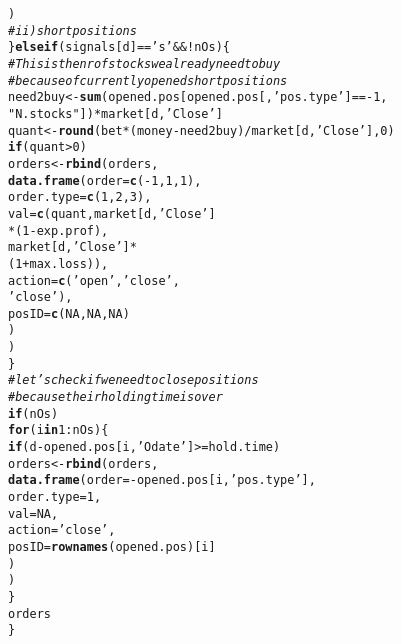 \documentclass{article}\usepackage[]{graphicx}\usepackage[]{color}
\makeatletter
\newcommand{\hlnum}[1]{\textcolor[rgb]{0.686,0.059,0.569}{#1}}%
\newcommand{\hlstr}[1]{\textcolor[rgb]{0.192,0.494,0.8}{#1}}%
\newcommand{\hlcom}[1]{\textcolor[rgb]{0.678,0.584,0.686}{\textit{#1}}}%
\newcommand{\hlopt}[1]{\textcolor[rgb]{0,0,0}{#1}}%
\newcommand{\hlstd}[1]{\textcolor[rgb]{0.345,0.345,0.345}{#1}}%
\newcommand{\hlkwa}[1]{\textcolor[rgb]{0.161,0.373,0.58}{\textbf{#1}}}%
\newcommand{\hlkwb}[1]{\textcolor[rgb]{0.69,0.353,0.396}{#1}}%
\newcommand{\hlkwc}[1]{\textcolor[rgb]{0.333,0.667,0.333}{#1}}%
\newcommand{\hlkwd}[1]{\textcolor[rgb]{0.737,0.353,0.396}{\textbf{#1}}}%
\newenvironment{kframe}{%
 \def\at@end@of@kframe{}%
 \ifinner\ifhmode%
  \def\at@end@of@kframe{\end{minipage}}%
  \begin{minipage}{\columnwidth}%
 \fi\fi%
 \def\FrameCommand##1{\hskip\@totalleftmargin \hskip-\fboxsep
 \colorbox{shadecolor}{##1}\hskip-\fboxsep
     \hskip-\linewidth \hskip-\@totalleftmargin \hskip\columnwidth}%
 \MakeFramed {\advance\hsize-\width
   \@totalleftmargin\z@ \linewidth\hsize
   \@setminipage}}%
 {\par\unskip\endMakeFramed%
 \at@end@of@kframe}
\newenvironment{knitrout}{}{} %
\makeatother
\begin{document}
\begin{knitrout}
\begin{kframe}
\begin{alltt}
                      \hlstd{)}
    \hlcom{#ii) short positions}
  \hlstd{\}} \hlkwa{else if} \hlstd{(signals[d]} \hlopt{==} \hlstr{'s'} \hlopt{&& !}\hlstd{nOs) \{}
    \hlcom{#This is the nr of stocks we already need to buy}
    \hlcom{#because of currently opened short positions}
    \hlstd{need2buy} \hlkwb{<-} \hlkwd{sum}\hlstd{(opened.pos[opened.pos[,} \hlstr{'pos.type'}\hlstd{]} \hlopt{== -}\hlnum{1}\hlstd{,}
                               \hlstr{"N.stocks"}\hlstd{])}\hlopt{*}\hlstd{market[d,} \hlstr{'Close'}\hlstd{]}
    \hlstd{quant} \hlkwb{<-} \hlkwd{round}\hlstd{(bet}\hlopt{*}\hlstd{(money}\hlopt{-}\hlstd{need2buy)}\hlopt{/}\hlstd{market[d,} \hlstr{'Close'}\hlstd{],} \hlnum{0}\hlstd{)}
    \hlkwa{if}\hlstd{(quant} \hlopt{>} \hlnum{0}\hlstd{)}
      \hlstd{orders} \hlkwb{<-} \hlkwd{rbind}\hlstd{(orders,}
                      \hlkwd{data.frame}\hlstd{(}\hlkwc{order} \hlstd{=} \hlkwd{c}\hlstd{(}\hlopt{-}\hlnum{1}\hlstd{,} \hlnum{1}\hlstd{,} \hlnum{1}\hlstd{),}
                                 \hlkwc{order.type} \hlstd{=} \hlkwd{c}\hlstd{(}\hlnum{1}\hlstd{,} \hlnum{2}\hlstd{,} \hlnum{3}\hlstd{),}
                                 \hlkwc{val} \hlstd{=} \hlkwd{c}\hlstd{(quant, market[d,} \hlstr{'Close'}\hlstd{]}
                                         \hlopt{*}\hlstd{(}\hlnum{1}\hlopt{-}\hlstd{exp.prof),}
                                         \hlstd{market[d,} \hlstr{'Close'}\hlstd{]}\hlopt{*}
                                           \hlstd{(}\hlnum{1} \hlopt{+} \hlstd{max.loss)),}
                                 \hlkwc{action} \hlstd{=} \hlkwd{c}\hlstd{(}\hlstr{'open'}\hlstd{,} \hlstr{'close'}\hlstd{,}
                                            \hlstr{'close'}\hlstd{),}
                                 \hlkwc{posID} \hlstd{=} \hlkwd{c}\hlstd{(}\hlnum{NA}\hlstd{,} \hlnum{NA}\hlstd{,} \hlnum{NA}\hlstd{)}
                                 \hlstd{)}
                      \hlstd{)}
  \hlstd{\}}
  \hlcom{#let's check if we need to close positions}
  \hlcom{#because their holding time is over }
  \hlkwa{if}\hlstd{(nOs)}
    \hlkwa{for}\hlstd{(i} \hlkwa{in} \hlnum{1}\hlopt{:}\hlstd{nOs) \{}
      \hlkwa{if}\hlstd{(d} \hlopt{-} \hlstd{opened.pos[i,} \hlstr{'Odate'}\hlstd{]} \hlopt{>=} \hlstd{hold.time)}
        \hlstd{orders} \hlkwb{<-} \hlkwd{rbind}\hlstd{(orders,}
                        \hlkwd{data.frame}\hlstd{(}\hlkwc{order} \hlstd{=} \hlopt{-}\hlstd{opened.pos[i,} \hlstr{'pos.type'}\hlstd{],}
                                   \hlkwc{order.type} \hlstd{=} \hlnum{1}\hlstd{,}
                                   \hlkwc{val} \hlstd{=} \hlnum{NA}\hlstd{,}
                                   \hlkwc{action} \hlstd{=} \hlstr{'close'}\hlstd{,}
                                   \hlkwc{posID} \hlstd{=} \hlkwd{rownames}\hlstd{(opened.pos)[i]}
                                   \hlstd{)}
                        \hlstd{)}
        \hlstd{\}}
  \hlstd{orders}
\hlstd{\}}
\end{alltt}
\end{kframe}
\end{knitrout}
\end{document}
